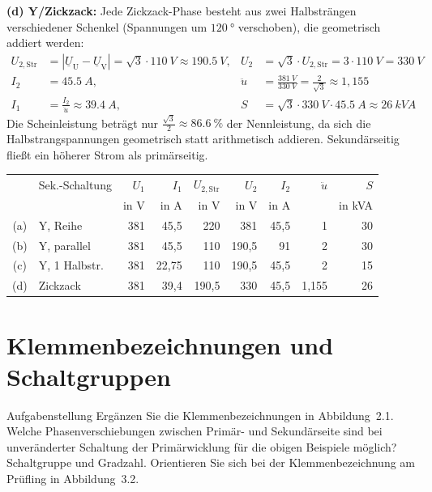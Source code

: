 \documentclass[a4paper,11pt]{scrreprt}
\newcommand{\ue}{\ddot{u}}
\begin{document}
\textbf{(d) Y/Zickzack:} Jede Zickzack-Phase besteht aus zwei Halbsträngen verschiedener Schenkel (Spannungen um $\SI{120}{\degree}$ verschoben), die geometrisch addiert werden:
\begin{align*}
  U_{2,\mathrm{Str}} &= |\underline{U}_\mathrm{U} - \underline{U}_\mathrm{V}| = \sqrt{3}\cdot\SI{110}{V} \approx \SI{190.5}{V}, &
  U_2 &= \sqrt{3}\cdot U_{2,\mathrm{Str}} = 3\cdot\SI{110}{V} = \SI{330}{V}\\
  I_2 &= \SI{45.5}{A}, &
  \ue &= \frac{\SI{381}{V}}{\SI{330}{V}} = \frac{2}{\sqrt{3}} \approx 1{,}155\\
  I_1 &= \frac{I_2}{\ue} \approx \SI{39.4}{A}, &
  S &= \sqrt{3}\cdot\SI{330}{V}\cdot\SI{45.5}{A} \approx \SI{26}{kVA}
\end{align*}
Die Scheinleistung beträgt nur $\frac{\sqrt{3}}{2} \approx \SI{86.6}{\percent}$ der Nennleistung, da sich die Halbstrangspannungen geometrisch statt arithmetisch addieren. Sekundärseitig fließt ein höherer Strom als primärseitig.

\begin{ergebnis}
\centering
\small
\setlength{\tabcolsep}{4pt}
\begin{tabular}{@{}cl*{7}{r}@{}}
\toprule
 & Sek.-Schaltung & $U_1$ & $I_1$ & $U_{2,\mathrm{Str}}$ & $U_2$ & $I_2$ & $\ue$ & $S$\\
 &  & in V & in A & in V & in V & in A & & in kVA\\
\midrule
(a) & Y, Reihe    & 381 & 45,5  & 220   & 381   & 45,5 & 1     & 30\\
(b) & Y, parallel & 381 & 45,5  & 110   & 190,5 & 91   & 2     & 30\\
(c) & Y, 1 Halbstr. & 381 & 22,75 & 110 & 190,5 & 45,5 & 2     & 15\\
(d) & Zickzack    & 381 & 39,4  & 190,5 & 330   & 45,5 & 1,155 & 26\\
\bottomrule
\end{tabular}
\end{ergebnis}

\section{Klemmenbezeichnungen und Schaltgruppen}\label{sec:a3}

\begin{aufgabe}{Aufgabenstellung}
Ergänzen Sie die Klemmenbezeichnungen in Abbildung~2.1. Welche Phasenverschiebungen zwischen Primär- und Sekundärseite sind bei unveränderter Schaltung der Primärwicklung für die obigen Beispiele möglich? Schaltgruppe und Gradzahl. Orientieren Sie sich bei der Klemmenbezeichnung am Prüfling in Abbildung~3.2.
\end{aufgabe}
\end{document}
